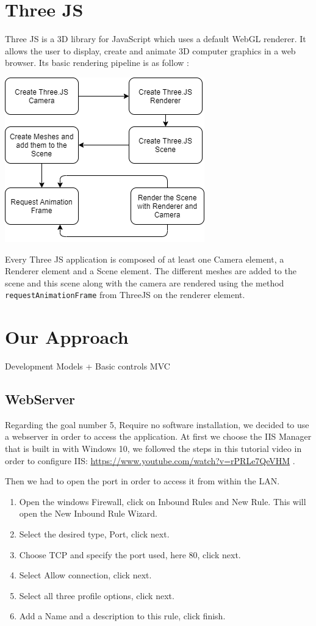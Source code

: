\documentclass{scrartcl}
\begin{document}
\section{Three JS}

Three JS is a 3D library for JavaScript which uses a default WebGL renderer. It allows the user to display, create and animate 3D computer graphics in a web browser. Its basic rendering pipeline is as follow :
\begin{center}
  \includegraphics[scale=0.5]{./basic_threejs_rendering}
\end{center}

Every Three JS application is composed of at least one Camera element, a Renderer element and a Scene element. The different meshes are added to the scene and this scene along with the camera are rendered using the method 
\texttt{requestAnimationFrame} from ThreeJS on the renderer element. 

\section{Our Approach}

Development
Models + Basic controls
MVC
\subsection{WebServer}
Regarding the goal number 5, Require no software installation, we decided to use a webserver in order to access the application. At first we choose the IIS Manager that is built in with Windows 10, 
we followed the steps in this tutorial video in order to configure IIS: \url{https://www.youtube.com/watch?v=rPRLe7QeVHM} .

Then we had to open the port in order to access it from within the LAN.
\begin{enumerate}
  \item Open the windows Firewall, click on Inbound Rules and New Rule. This will open the New Inbound Rule Wizard.
  \item Select the desired type, Port, click next.
  \item Choose TCP and specify the port used, here 80, click next.
  \item Select Allow connection, click next.
  \item Select all three profile options, click next.
  \item Add a Name and a description to this rule, click finish.
\end{enumerate}
\end{document}
